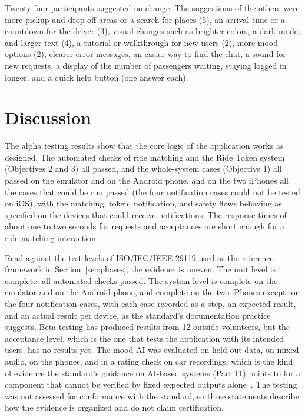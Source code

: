 Twenty-four participants suggested no change. The suggestions of the others were more pickup and drop-off areas or a search for places (5), an arrival time or a countdown for the driver (3), visual changes such as brighter colors, a dark mode, and larger text (4), a tutorial or walkthrough for new users (2), more mood options (2), clearer error messages, an easier way to find the chat, a sound for new requests, a display of the number of passengers waiting, staying logged in longer, and a quick help button (one answer each).

\section{Discussion}
The alpha testing results show that the core logic of the application works as designed. The automated checks of ride matching and the Ride Token system (Objectives 2 and 3) all passed, and the whole-system cases (Objective 1) all passed on the emulator and on the Android phone, and on the two iPhones all the cases that could be run passed (the four notification cases could not be tested on iOS), with the matching, token, notification, and safety flows behaving as specified on the devices that could receive notifications. The response times of about one to two seconds for requests and acceptances are short enough for a ride-matching interaction.

Read against the test levels of ISO/IEC/IEEE 29119 used as the reference framework in Section~\ref{sec:phases}, the evidence is uneven. The unit level is complete: all automated checks passed. The system level is complete on the emulator and on the Android phone, and complete on the two iPhones except for the four notification cases, with each case recorded as a step, an expected result, and an actual result per device, as the standard's documentation practice suggests. Beta testing has produced results from 12 outside volunteers, but the acceptance level, which is the one that tests the application with its intended users, has no results yet. The mood AI was evaluated on held-out data, on mixed audio, on the phones, and in a rating check on car recordings, which is the kind of evidence the standard's guidance on AI-based systems (Part 11) points to for a component that cannot be verified by fixed expected outputs alone~\cite{iso29119site}. The testing was not assessed for conformance with the standard, so these statements describe how the evidence is organized and do not claim certification.

